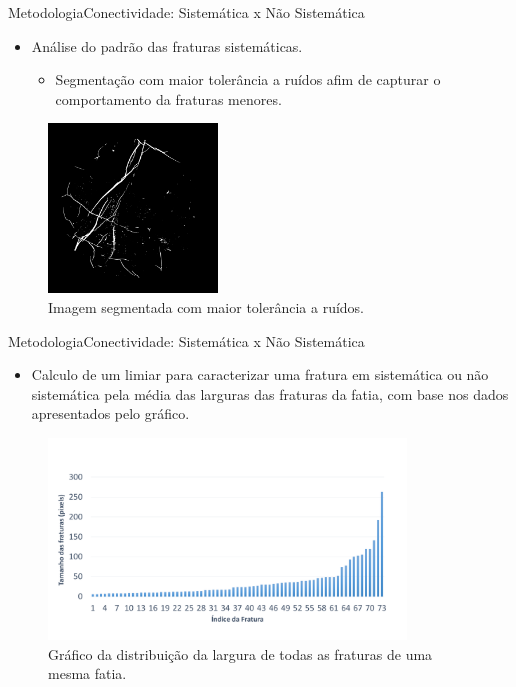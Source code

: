 \documentclass{beamer}
\begin{document}
\begin{frame}{Metodologia}{Conectividade: Sistemática x Não Sistemática}
    \begin{itemize}
        \item Análise do padrão das fraturas sistemáticas.
           \begin{itemize}
               \item Segmentação com maior tolerância a ruídos afim de capturar o comportamento da fraturas menores.
           \end{itemize}
       
    \end{itemize}    
    
    \begin{figure}[!htb]
    \centering
    \includegraphics[width=4.5cm]{fig/seg_ruidos.png}\\
    \scriptsize{Imagem segmentada com maior tolerância a ruídos.}
    \end{figure}

\end{frame}    

\begin{frame}{Metodologia}{Conectividade: Sistemática x Não Sistemática}
    
    \begin{itemize}
        \item  Calculo de um limiar para caracterizar uma fratura em sistemática ou não sistemática pela média das larguras das fraturas da fatia, com base nos dados apresentados pelo gráfico.
    \end{itemize}    
    
    \begin{figure}[!htb]
    \centering
    \includegraphics[width=9.5cm]{fig/grafico-distribuicao.pdf}\\
    \scriptsize{Gráfico da distribuição da largura de todas as fraturas de uma mesma fatia.}
    \end{figure}

\end{frame}
\end{document}
